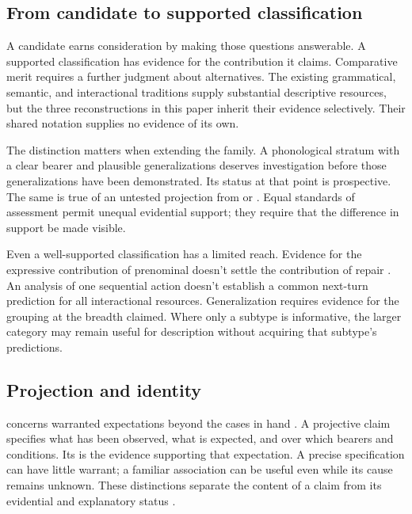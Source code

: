 \subsection{From candidate to supported classification}

A candidate earns consideration by making those questions answerable. A
supported classification has evidence for the contribution it claims.
Comparative merit requires a further judgment about alternatives. The
existing grammatical, semantic, and interactional traditions supply
substantial descriptive resources, but the three reconstructions in this
paper inherit their evidence selectively. Their shared notation supplies
no evidence of its own.

The distinction matters when extending the family. A phonological stratum
with a clear bearer and plausible generalizations deserves investigation
before those generalizations have been demonstrated. Its status at that
point is prospective. The same is true of an untested projection from
 or . Equal standards of assessment permit unequal
evidential support; they require that the difference in support be made
visible.

Even a well-supported classification has a limited reach. Evidence for
the expressive contribution of prenominal  doesn't settle
the contribution of repair . An analysis of one sequential
action doesn't establish a common next-turn prediction for all interactional
resources. Generalization requires evidence for the grouping at the breadth
claimed. Where only a subtype is informative, the larger category may
remain useful for description without acquiring that subtype's predictions.

\subsection{Projection and identity}

 concerns warranted expectations beyond the cases in
hand \citep{Goodman1955}. A projective claim specifies what has been observed,
what is expected, and over which bearers and conditions. Its 
is the evidence supporting that expectation. A precise specification can
have little warrant; a familiar association can be useful even while its
cause remains unknown. These distinctions separate the content of a claim
from its evidential and explanatory status
\citep[11--12]{reynolds2026projectibilityHistory}.

